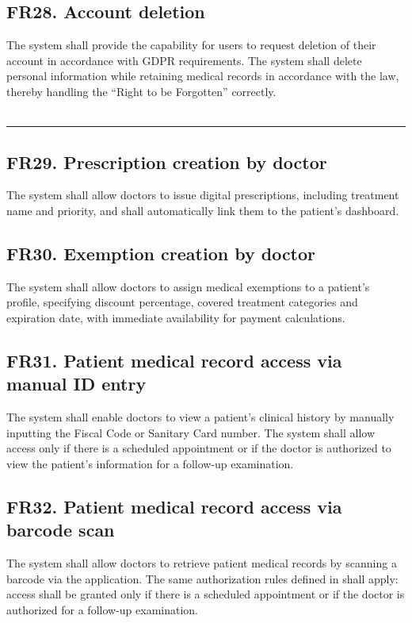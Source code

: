 \documentclass[12pt, a4paper]{article}
\begin{document}
\subsection{FR28. Account deletion} \label{FR28}
The system shall provide the capability for users to request deletion of their account in accordance with GDPR requirements. The system shall delete personal information while retaining medical records in accordance with the law, thereby handling the ``Right to be Forgotten'' correctly.
\\ 
\\ 

\noindent\rule{\textwidth}{0.4pt}
\medskip
\subsection{FR29. Prescription creation by doctor} \label{FR29}
The system shall allow doctors to issue digital prescriptions, including treatment name and priority, and shall automatically link them to the patient's dashboard.
\\ 

\subsection{FR30. Exemption creation by doctor} \label{FR30}
The system shall allow doctors to assign medical exemptions to a patient's profile, specifying discount percentage, covered treatment categories and expiration date, with immediate availability for payment calculations.
\\ 

\subsection{FR31. Patient medical record access via manual ID entry} \label{FR31}
The system shall enable doctors to view a patient's clinical history by manually inputting the Fiscal Code or Sanitary Card number. The system shall allow access only if there is a scheduled appointment or if the doctor is authorized to view the patient's information for a follow-up examination.
\\ 

\subsection{FR32. Patient medical record access via barcode scan} \label{FR32}
The system shall allow doctors to retrieve patient medical records by scanning a barcode via the application. The same authorization rules defined in  shall apply: access shall be granted only if there is a scheduled appointment or if the doctor is authorized for a follow-up examination.
\\ 
\end{document}
